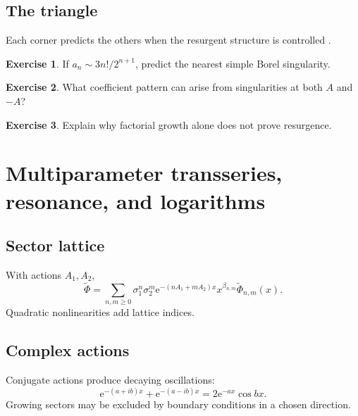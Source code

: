 \documentclass[11pt,oneside,openany]{book}
\newcommand{\e}{\mathrm{e}}
\theoremstyle{plain}
\theoremstyle{definition}
\newtheorem{exercise}{Exercise}[chapter]
\theoremstyle{remark}
\begin{document}
\section{The triangle}
\begin{center}
\end{center}
Each corner predicts the others when the resurgent structure is controlled \cite{AnicetoBasarSchiappa,Dorigoni}.

\begin{exercise}
If $a_n\sim3n!/2^{n+1}$, predict the nearest simple Borel singularity.
\end{exercise}

\begin{exercise}
What coefficient pattern can arise from singularities at both $A$ and $-A$?
\end{exercise}

\begin{exercise}
Explain why factorial growth alone does not prove resurgence.
\end{exercise}


\chapter{Multiparameter transseries, resonance, and logarithms}
\label{ch:resonance}

\section{Sector lattice}
With actions $A_1,A_2$,
\[
  \widetilde\Phi=
  \sum_{n,m\ge0}\sigma_1^n\sigma_2^m
  \e^{-(nA_1+mA_2)x}
  x^{\beta_{n,m}}\widetilde\Phi_{n,m}(x).
\]
Quadratic nonlinearities add lattice indices.

\section{Complex actions}
Conjugate actions produce decaying oscillations:
\[
  \e^{-(a+ib)x}+\e^{-(a-ib)x}
  =2\e^{-ax}\cos bx.
\]
Growing sectors may be excluded by boundary conditions in a chosen direction.
\end{document}
